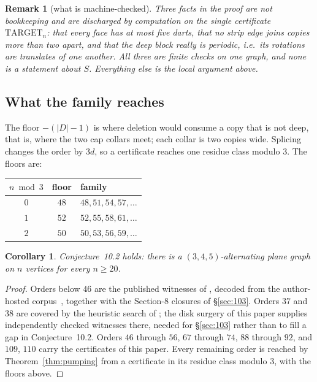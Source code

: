 \documentclass{baustms}
\theoremstyle{cupthm}
\newtheorem{corollary}[theorem]{Corollary}
\theoremstyle{cupdefn}
\theoremstyle{cuprem}
\newtheorem{remark}[theorem]{Remark}
\begin{document}
\begin{remark}[what is machine-checked]\label{rem:hypotheses}
Three facts in the proof are not bookkeeping and are discharged by computation
on the single certificate $\mathrm{TARGET}_n$: that every face has at most five
darts, that no strip edge joins copies more than two apart, and that the deep
block really is periodic, i.e.\ its rotations are translates of one another. All
three are finite checks on one graph, and none is a statement about $S$.
Everything else is the local argument above.
\end{remark}

\subsection{What the family reaches}

The floor $-(|D|-1)$ is where deletion would consume a copy that is not deep,
that is, where the two cap collars meet; each collar is two copies wide.
Splicing changes the order by $3d$, so a certificate reaches one residue class
modulo $3$. The floors are:

\begin{center}
\begin{tabular}{ccl}
\toprule
$n \bmod 3$ & floor & family \\
\midrule
$0$ & $48$ & $48, 51, 54, 57, \dots$ \\
$1$ & $52$ & $52, 55, 58, 61, \dots$ \\
$2$ & $50$ & $50, 53, 56, 59, \dots$ \\
\bottomrule
\end{tabular}
\end{center}

\begin{corollary}\label{cor:102}
Conjecture~10.2 holds: there is a $(3,4,5)$-alternating plane graph on $n$
vertices for every $n \ge 20$.
\end{corollary}

\begin{proof}
Orders below $46$ are the published witnesses of \cite{AHSSV2015}, decoded from
the author-hosted corpus~\cite{APGcorpus}, together with the Section-8 closures
of \S\ref{sec:103}. Orders $37$ and $38$ are covered by the heuristic search of
\cite{AHSSV2015}; the disk surgery of this paper supplies independently checked
witnesses there, needed for \S\ref{sec:103} rather than to fill a gap in
Conjecture~10.2. Orders $46$ through $56$, $67$
through $74$, $88$ through $92$, and $109$, $110$ carry the certificates of this
paper. Every remaining order is reached by Theorem~\ref{thm:pumping} from a
certificate in its residue class modulo $3$, with the floors above.
\end{proof}
\end{document}

